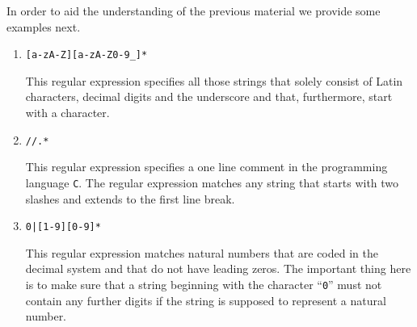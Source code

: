 \examplesEng
In order to aid the understanding of the previous material we provide some examples next.
\begin{enumerate}
\item \texttt{[a-zA-Z][a-zA-Z0-9\_]*}

      This regular expression specifies all those strings that solely consist of Latin characters,
      decimal digits and the underscore and that, furthermore, start with a character.

\item \texttt{//.*}

      This regular expression specifies a one line comment in the programming language \texttt{C}.
      The regular expression matches any string that starts with two slashes and extends to the
      first line break.
\item \texttt{0|[1-9][0-9]*}

      This regular expression matches natural numbers that are coded in the decimal system and that
      do not have leading zeros.  The important thing here is to make sure that a string beginning
      with the character ``\texttt{0}'' must not contain any further digits if the string is
      supposed to represent a natural number.
\end{enumerate}


